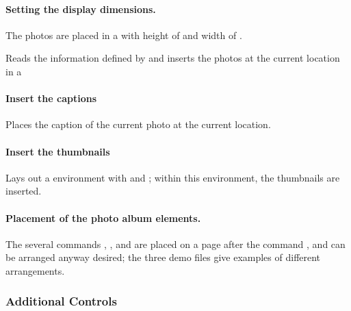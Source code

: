 \documentclass{article}
\begin{document}
\paragraph*{Setting the display dimensions.} The photos are placed in a 
with height of  and width of .
\bVerb\def\1{n}%
\begin{dCmd*}[commandchars=!()]{\bxSize}
\end{dCmd*}
\eVerb Reads the information defined by  and inserts
the photos at the current location in a 

\paragraph*{Insert the captions}\leavevmode
\bVerb\def\1{n}\takeMeasure{\string\insertCaptions}%
\begin{dCmd*}[commandchars=!()]{\bxSize}
\insertCaptions
\end{dCmd*}
\eVerb Places the caption of the current photo at the current location.

\paragraph*{Insert the thumbnails}\leavevmode
\bVerb{}%
\begin{dCmd*}[commandchars=!()]{\bxSize}
\end{dCmd*}
\eVerb
Lays out a  environment with  and
; within this  environment, the thumbnails are
inserted.

\paragraph*{Placement of the photo album elements.}
The several commands , , and
 are placed on a page after the command ,
and can be arranged anyway desired; the three demo files give examples of
different arrangements.

\subsubsection{Additional Controls}
\end{document}
